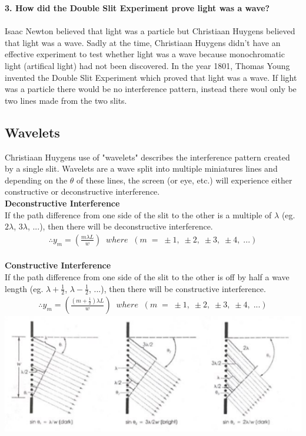\documentclass{article}
\begin{document}
\vspace{3cm}

\noindent\textbf{3. How did the Double Slit Experiment prove light was a wave?}\\\\
Isaac Newton believed that light was a particle but Christiaan Huygens believed that light was a wave. Sadly at the time, Christiaan Huygens didn't have an effective experiment to test whether light was a wave because monochromatic light (artifical light) had not been discovered. In the year 1801, Thomas Young invented the Double Slit Experiment which proved that light was a wave. If light was a particle there would be no interference pattern, instead there woul only be two lines made from the two slits.
\subsection{Wavelets}
Christiaan Huygens use of "wavelets" describes the interference pattern created by a single slit. Wavelets are a wave split into multiple miniatures lines and depending on the $\theta$ of these lines, the screen (or eye, etc.) will experience either constructive or deconstructive interference.\\

\noindent\textbf{Deconstructive Interference}\\
If the path difference from one side of the slit to the other is a multiple of $\lambda$ (eg. $2\lambda$, $3\lambda$, ...), then there will be deconstructive interference.
\begin{align*}
    \therefore y_m = \left(\frac{m\lambda L}{w}\right)\;\; where\;\;(m\;=\;\pm 1,\;\pm 2,\;\pm 3,\;\pm 4,\;...)
\end{align*}\leavevmode\\

\noindent\textbf{Constructive Interference}\\
If the path difference from one side of the slit to the other is off by half a wave length (eg. $\lambda + \frac{1}{2}$, $\lambda - \frac{1}{2}$, ...), then there will be constructive interference.
\begin{align*}
    \therefore y_m = \left(\frac{(m + \frac{1}{2})\lambda L}{w}\right)\;\; where\;\;(m\;=\;\pm 1,\;\pm 2,\;\pm 3,\;\pm 4,\;...)
\end{align*}\leavevmode
\includegraphics[scale=0.8]{images/wavelets} \\
\end{document}
